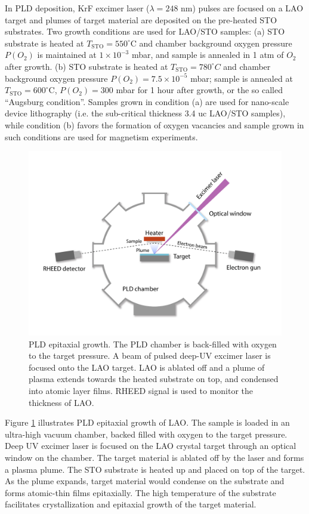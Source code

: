 \documentclass[pdflatex, sectionletters, 12pt]{pittetd}    %
\begin{document}
In PLD deposition, KrF excimer laser ($\lambda = 248$ nm) pulses are focused on a LAO target and plumes of target material are deposited on the pre-heated STO substrates. Two growth conditions are used for LAO/STO samples: (a) STO substrate is heated at $T_\mathrm{STO} = 550^{\circ}$C and chamber background oxygen pressure $P(O_2)$ is maintained at $1 \times 10^{-3}$ mbar, and sample is annealed in 1 atm of $O_2$ after growth. (b) STO substrate is heated at $T_\mathrm{STO} = 780^{\circ}C$ and chamber background oxygen pressure $P(O_2) = 7.5 \times 10^{-5}$ mbar; sample is annealed at $T_\mathrm{STO} = 600^{\circ}$C, $P(O_2) = 300$ mbar for 1 hour after growth, or the so called ``Augsburg condition''. Samples grown in condition (a) are used for nano-scale device lithography (i.e. the sub-critical thickness 3.4 uc LAO/STO samples), while condition (b) favors the formation of oxygen vacancies and sample grown in such conditions are used for magnetism experiments\cite{}. 

\begin{figure}[p]
	\centering
	\includegraphics[width=1.0\textwidth]{Drawing/PLD.pdf}
	\caption{PLD epitaxial growth. The PLD chamber is back-filled with oxygen to the target pressure. A beam of pulsed deep-UV excimer laser is focused onto the LAO target. LAO is ablated off and a plume of plasma extends towards the heated substrate on top, and condensed into atomic layer films. RHEED signal is used to monitor the thickness of LAO.}
	\label{FIG:PLD}
\end{figure}

Figure \ref{FIG:PLD} illustrates PLD epitaxial growth of LAO. The sample is loaded in an ultra-high vacuum chamber, backed filled with oxygen to the target pressure. Deep UV excimer laser is focused on the LAO crystal target through an optical window on the chamber. The target material is ablated off by the laser and forms a plasma plume. The STO substrate is heated up and placed on top of the target. As the plume expands, target material would condense on the substrate and forms atomic-thin films epitaxially. The high temperature of the substrate facilitates crystallization and epitaxial growth of the target material. 
\end{document}
